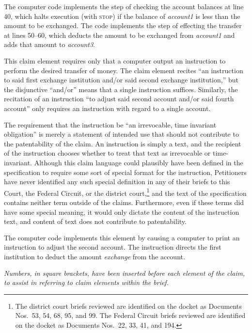 \documentclass{scotus}
\begin{document}
The computer code implements the step of checking the account balances at line
40, which halts execution (with \textsc{stop}) if the balance of
\emph{account1} is less than the amount to be exchanged. The code implements the
step of effecting the transfer at lines 50--60, which deducts the amount to be
exchanged from \emph{account1} and adds that amount to \emph{account3}.


This claim element requires only that a computer output an instruction to
perform the desired transfer of money. The claim element recites ``an
instruction to said first exchange institution and/or said second exchange
institution,'' but the disjunctive ``and/or'' means that a single instruction
suffices. Similarly, the recitation of an instruction ``to adjust said second
account and/or said fourth account'' only requires an instruction with regard to
a single account.

The requirement that the instruction be ``an irrevocable, time invariant
obligation'' is merely a statement of intended use that should not contribute to
the patentability of the claim. An instruction is simply a text, and the
recipient of the instruction chooses whether to treat that text as irrevocable
or time-invariant. Although this claim language could plausibly have been
defined in the specification to require some sort of special format for the
instruction, Petitioners have never identified any such special definition in
any of their briefs to this Court, the Federal Circuit, or the district
court,\footnote{The district court briefs reviewed are identified on the docket
as Documents Nos.\ 53, 54, 68, 95, and 99. The Federal Circuit briefs reviewed
are identified on the docket as Documents Nos.\ 22, 33, 41, and 194.}
and the text of the
specification contains neither term outside of the claims. Furthermore, even if
these terms did have some special meaning, it would only dictate the content of
the instruction text, and content of text does not contribute to patentability.

The computer code implements this element by causing a computer to print an
instruction to adjust the second account. The instruction directs the
first institution to deduct the amount \emph{exchange} from the account.


\emph{Numbers, in square brackets, have been inserted before each element of the
claim, to assist in referring to claim elements within the brief.}

\wholeclaim
\end{document}
